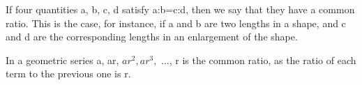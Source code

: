 If four quantities a, b, c, d satisfy a:b=c:d, then we say that they have a common ratio.
This is the case, for instance, if a and b are two lengths in a shape,
and c and d are the corresponding lengths in an enlargement of the shape.

\par
In a geometric series a, ar, $ar^{2}, ar^{3},$  ..., r is the common ratio, as the ratio of each term to the previous one is r.